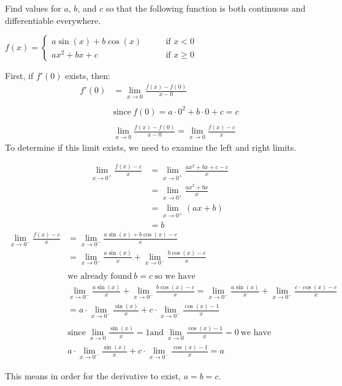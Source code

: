 \documentclass[nooutcomes,handout]{ximera}
\begin{document}
\begin{problem}
Find values for $a$, $b$, and $c$ so that the following function is both continuous and differentiable everywhere.

$f(x) =   \left\{ \begin{array}{cl}
	a \sin(x) + b \cos(x)		 	&	\qquad \text{if } x < 0					\\
	ax^2 + bx + c   				&	\qquad \text{if } x \geq 0	 \end{array} \right.  $
		\begin{freeResponse}
		First, if $f'(0)$ exists, then:
		\begin{align*}
		f'(0)&=\lim_{x\to 0} \frac{f(x)-f(0)}{x-0}\\\\
		& \text{since}\ f(0)=a \cdot 0^2+b \cdot 0 +c =c\\\\
		& \lim_{x\to 0} \frac{f(x)-f(0)}{x-0}=\lim_{x\to 0} \frac{f(x)-c}{x}
		\end{align*}
		To determine if this limit exists, we need to examine the left and right limits.
		
		\begin{align*}
		\lim_{x\to 0^+} \frac{f(x)-c}{x}&=\lim_{x\to 0^+} \frac{ax^2+bx+c-c}{x}\\
		&=\lim_{x\to 0^+} \frac{ax^2+bx}{x}\\
		&=\lim_{x\to 0^+} (ax+b)\\
		&=b
		\end{align*}
		\begin{align*}
		\lim_{x\to 0^-} \frac{f(x)-c}{x}&=\lim_{x\to 0^-} \frac{a \sin(x)+b \cos(x)-c}{x}\\
		&=\lim_{x\to 0^-} \frac{a \sin(x)}{x}+\lim_{x\to 0^-} \frac{b\cos(x)-c}{x}\\ \\
		& \text{we already found}\ b=c \ \text{so we have}\\
		&\lim_{x\to 0^-} \frac{a \sin(x)}{x}+\lim_{x\to 0^-} \frac{b \cos(x)-c}{x}=\lim_{x\to 0^-} \frac{a \sin(x)}{x}+\lim_{x\to 0^-} \frac{c\cdot \cos(x)-c}{x}\\
		&=a\cdot \lim_{x\to 0^-} \frac{ \sin(x)}{x}+c \cdot \lim_{x\to 0^-} \frac{\cos(x)-1}{x}\\ \\
		& \text{since}\ \lim_{x\to 0} \frac{\sin(x)}{x}=1 \text{and}\  \lim_{x\to 0} \frac{\cos(x)-1}{x}=0 \ \text{we have}\\
		&a\cdot \lim_{x\to 0^-} \frac{\sin(x)}{x}+c \cdot \lim_{x\to 0^-} \frac{\cos(x)-1}{x}=a
		\end{align*}

		This means in order for the derivative to exist, $a=b=c$.
		\end{freeResponse}
\end{problem}
		
\end{document}
